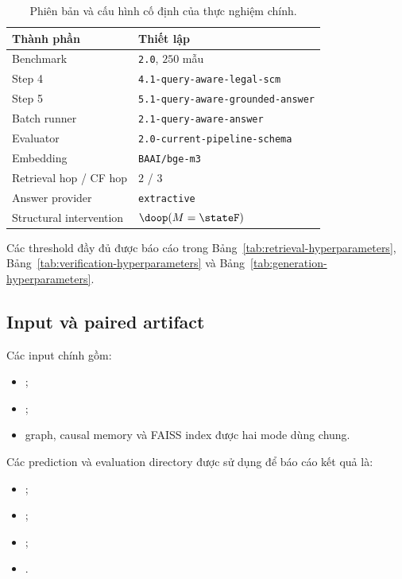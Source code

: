 \begin{table}[h]
    \centering
    \small
    \caption{Phiên bản và cấu hình cố định của thực nghiệm chính.}
    \label{tab:repro-settings}
    \begin{tabular}{@{}ll@{}}
        \toprule
        \textbf{Thành phần} & \textbf{Thiết lập} \\
        \midrule
        Benchmark & \texttt{2.0}, $250$ mẫu \\
        Step 4 & \texttt{4.1-query-aware-legal-scm} \\
        Step 5 & \texttt{5.1-query-aware-grounded-answer} \\
        Batch runner & \texttt{2.1-query-aware-answer} \\
        Evaluator & \texttt{2.0-current-pipeline-schema} \\
        Embedding & \texttt{BAAI/bge-m3} \\
        Retrieval hop / CF hop & $2$ / $3$ \\
        Answer provider & \texttt{extractive} \\
        Structural intervention & $\doop(M=\stateF)$ \\
        \bottomrule
    \end{tabular}
\end{table}

Các threshold đầy đủ được báo cáo trong
Bảng~\ref{tab:retrieval-hyperparameters},
Bảng~\ref{tab:verification-hyperparameters} và
Bảng~\ref{tab:generation-hyperparameters}.

\subsection{Input và paired artifact}

Các input chính gồm:

\begin{itemize}
    \item {};
    \item {};
    \item graph, causal memory và FAISS index được hai mode dùng chung.
\end{itemize}

Các prediction và evaluation directory được sử dụng để báo cáo kết quả là:

\begin{itemize}
    \item {};
    \item {};
    \item {};
    \item {}.
\end{itemize}

